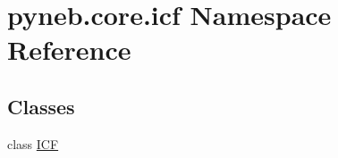 \hypertarget{namespacepyneb_1_1core_1_1icf}{}\section{pyneb.\+core.\+icf Namespace Reference}
\label{namespacepyneb_1_1core_1_1icf}
\subsection*{Classes}
\begin{DoxyCompactItemize}
\item 
class \hyperlink{classpyneb_1_1core_1_1icf_1_1_i_c_f}{I\+C\+F}
\end{DoxyCompactItemize}
